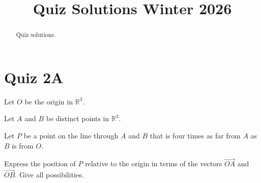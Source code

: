 \documentclass{ximera}
\title{Quiz Solutions Winter 2026}
\begin{document}
\begin{abstract}
Quiz solutions.
\end{abstract}
\maketitle

\section{Quiz 2A}

\begin{question} \label{QDfdf3r0}

Let $O$ be the origin in $\mathbb{R}^3$. 

Let $A$ and $B$ be distinct points in $\mathbb{R}^3$.

Let $P$ be a point on the line through $A$ and $B$ that is four times as far from $A$ as $B$ is from $O$.

Express the position of $P$ relative to the origin in terms of the vectors $\overrightarrow{OA}$ and $\overrightarrow{OB}$. Give all possibilities.
\end{question}
\end{document}

